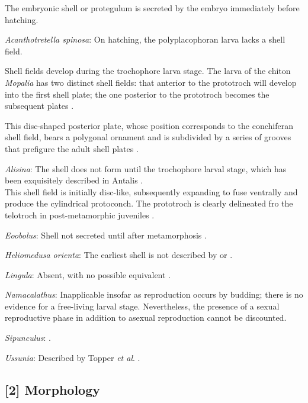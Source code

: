 \documentclass[openany]{book}
\theoremstyle{definition}
\theoremstyle{definition}
\theoremstyle{definition}
\theoremstyle{remark}
\begin{document}
The embryonic shell or protegulum is secreted by the embryo immediately
before hatching.

\hypertarget{Acanthotretella_spinosa-coding-1}{}
\emph{Acanthotretella spinosa}: On hatching, the polyplacophoran larva
lacks a shell field.

Shell fields develop during the trochophore larva stage. The larva of
the chiton \emph{Mopalia} has two distinct shell fields: that anterior
to the prototroch will develop into the first shell plate; the one
posterior to the prototroch becomes the subsequent plates
\citep{Wanninger2002C}.

This disc-shaped posterior plate, whose position corresponds to the
conchiferan shell field, bears a polygonal ornament and is subdivided by
a series of grooves that prefigure the adult shell plates
\citep{Wanninger2002C}.

\hypertarget{Alisina-coding-1}{}
\emph{Alisina}: The shell does not form until the trochophore larval
stage, which has been exquisitely described in Antalis
\citep{Wanninger2001}.\\
This shell field is initially disc-like, subsequently expanding to fuse
ventrally and produce the cylindrical protoconch. The prototroch is
clearly delineated fro the telotroch in post-metamorphic juveniles
\citep{Wanninger2001}.

\hypertarget{Eoobolus-coding-1}{}
\emph{Eoobolus}: Shell not secreted until after metamorphosis
\citep{Popov2010Earliestontogeny}.

\hypertarget{Heliomedusa_orienta-coding-1}{}
\emph{Heliomedusa orienta}: The earliest shell is not described by
\citet{Hanken1985Thetaxonomy} or \citet{Watkins2002Newrecord}.

\hypertarget{Lingula-coding-1}{}
\emph{Lingula}: Absent, with no possible equivalent \citep{Nielsen1966}.

\hypertarget{Namacalathus-coding-1}{}
\emph{Namacalathus}: Inapplicable insofar as reproduction occurs by
budding; there is no evidence for a free-living larval stage.
Nevertheless, the presence of a sexual reproductive phase in addition to
asexual reproduction cannot be discounted.

\hypertarget{Sipunculus-coding-1}{}
\emph{Sipunculus}: \citet{Reed1982}.

\hypertarget{Ussunia-coding-1}{}
\emph{Ussunia}: Described by Topper \emph{et al}.
\citeyearpar{Topper2013Reappraisalof}.

\subsection*{{[}2{]} Morphology}\label{morphology}
\end{document}
